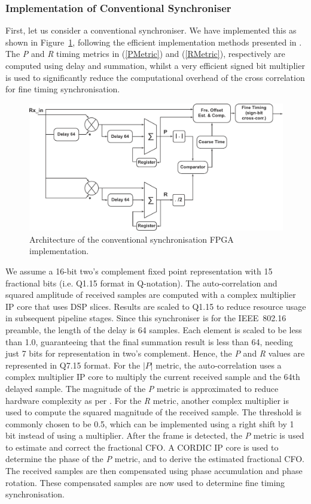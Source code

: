 		\subsubsection{Implementation of Conventional Synchroniser}

First, let us consider a conventional synchroniser. We have implemented this as shown in Figure~\ref{fig:Con-Sync}, following the efficient implementation methods presented in \cite{Manavi2004,Wang2004,Guffey2007,Liu2009}.
The \emph{P} and \emph{R} timing metrics in (\ref{PMetric}) and (\ref{RMetric}), respectively are computed using delay and summation, whilst a very efficient signed bit multiplier \cite{Schwoerer2002} is used to significantly reduce the computational overhead of the cross correlation for fine timing synchronisation.

\begin{figure}[h]
	\centerline{\includegraphics [width=0.8\columnwidth] {figures/Con_Sync.pdf}}
	\caption{Architecture of the conventional synchronisation FPGA implementation.}
	\label{fig:Con-Sync}
\end{figure}

We assume a 16-bit two's complement fixed point representation with 15 fractional bits (i.e. Q1.15 format in Q-notation).
The auto-correlation and squared amplitude of received samples are computed with a complex multiplier IP core that uses DSP slices.
Results are scaled to Q1.15 to reduce resource usage in subsequent pipeline stages.
Since this synchroniser is for the IEEE~802.16 preamble, the length of the delay is 64 samples.
Each element is scaled to be less than 1.0, guaranteeing that the final summation result is less than 64, needing just 7 bits for representation in two's complement.
Hence, the \emph{P} and \emph{R} values are represented in Q7.15 format.
For the $|P|$ metric, the auto-correlation uses a complex multiplier IP core to multiply the current received sample and the 64th delayed sample.
The magnitude of the \emph{P} metric is approximated to reduce hardware complexity as per \cite{Liu2009}.
For the \emph{R} metric, another complex multiplier is used to compute the squared magnitude of the received sample.
The threshold is commonly chosen to be 0.5, which can be implemented using a right shift by 1 bit \cite{Kim2008} instead of using a multiplier.
After the frame is detected, the \emph{P} metric is used to estimate and correct the fractional CFO.
A CORDIC IP core is used to determine the phase of the \emph{P} metric, and to derive the estimated fractional CFO.
The received samples are then compensated using phase accumulation and phase rotation.
These compensated samples are now used to determine fine timing synchronisation.

